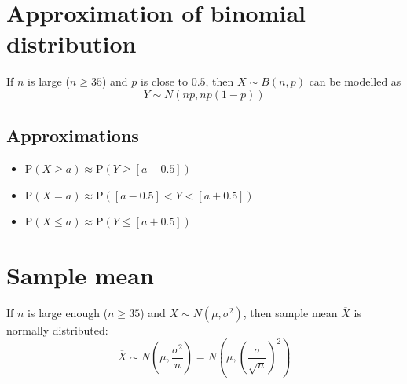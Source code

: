 \section{Approximation of binomial distribution}
If $n$ is large ($n\geq35$) and $p$ is close to $0.5$, then $X \sim B(n,p)$ can be modelled as $$Y \sim N(np, np(1-p))$$
\subsection{Approximations}
\begin{itemize}
    \item $\text{P}(X\geq a)\approx \text{P}(Y\geq [a-0.5])$
    \item $\text{P}(X=a)\approx \text{P}([a-0.5]<Y<[a+0.5])$
    \item $\text{P}(X \leq a)\approx \text{P}(Y\leq [a+0.5])$
\end{itemize}


\section{Sample mean}
If $n$ is large enough ($n\geq35$) and $X\sim N(\mu, \sigma^2)$, then sample mean $\overline{X}$ is
normally distributed:
$$\overline{X} \sim N\left(\mu, \frac{\sigma^2}{n}\right)=N\left(\mu, \left(\frac{\sigma}{\sqrt{n}}\right)^2\right)$$